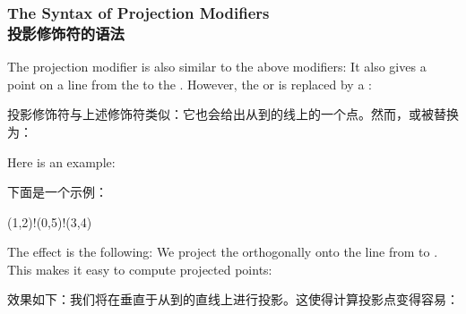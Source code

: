 \subsubsection{The Syntax of Projection Modifiers\\投影修饰符的语法}

The projection modifier is also similar to the above modifiers: It also gives a
point on a line from the  to the .
However, the  or  is replaced by a
:


投影修饰符与上述修饰符类似：它也会给出从到的线上的一个点。然而，或被替换为：
%
\begin{quote}
\end{quote}

Here is an example:

下面是一个示例：
%
\begin{codeexample}
(1,2)!(0,5)!(3,4)
\end{codeexample}

The effect is the following: We project the 
orthogonally onto the line from  to .
This makes it easy to compute projected points:

效果如下：我们将在垂直于从到的直线上进行投影。这使得计算投影点变得容易：
%
\begin{codeexample}[preamble={\usetikzlibrary{calc}}]
\end{codeexample}
